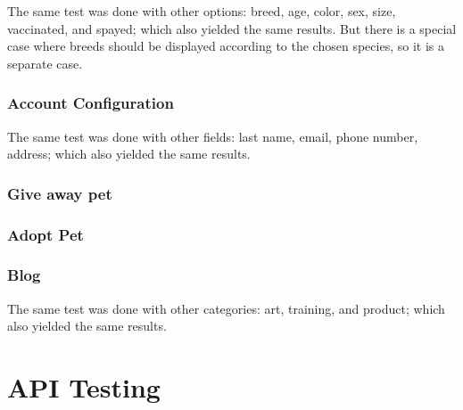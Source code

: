 

The same test was done with other options: breed, age, color, sex, size, vaccinated, and spayed; which also yielded the same results. But there is a special case where breeds should be displayed according to the chosen species, so it is a separate case.



\subsubsection*{Account Configuration}





The same test was done with other fields: last name, email, phone number, address; which also yielded the same results.

\subsubsection*{Give away pet}









\subsubsection*{Adopt Pet}







\subsubsection*{Blog}





The same test was done with other categories: art, training, and product; which also yielded the same results.





\section{API Testing}

